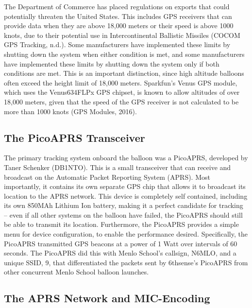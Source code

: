 \documentclass[12pt,]{article}
\begin{document}
The Department of Commerce has placed regulations on exports that could
potentially threaten the United States. This includes GPS receivers that
can provide data when they are above 18,000 meters or their speed is
above 1000 knots, due to their potential use in Intercontinental
Ballistic Missiles (COCOM GPS Tracking, n.d.). Some manufacturers have
implemented these limits by shutting down the system when either
condition is met, and some manufacturers have implemented these limits
by shutting down the system only if both conditions are met. This is an
important distinction, since high altitude balloons often exceed the
height limit of 18,000 meters. Sparkfun's Venus GPS module, which uses
the Venus634FLPx GPS chipset, is known to allow altitudes of over 18,000
meters, given that the speed of the GPS receiver is not calculated to be
more than 1000 knots (GPS Modules, 2016).

\subsection{The PicoAPRS Transceiver}\label{the-picoaprs-transceiver}

The primary tracking system onboard the balloon was a PicoAPRS,
developed by Taner Schenker (DB1NTO). This is a small transceiver that
can receive and broadcast on the Automatic Packet Reporting System
(APRS). Most importantly, it contains its own separate GPS chip that
allows it to broadcast its location to the APRS network. This device is
completely self contained, including its own 850MAh Lithium Ion battery,
making it a perfect candidate for tracking -- even if all other systems
on the balloon have failed, the PicoAPRS should still be able to
transmit its location. Furthermore, the PicoAPRS provides a simple menu
for device configuration, to enable the performance desired.
Specifically, the PicoAPRS transmitted GPS beacons at a power of 1 Watt
over intervals of 60 seconds. The PicoAPRS did this with Menlo School's
callsign, N6MLO, and a unique SSID, 9, that differentiated the packets
sent by 6thsense's PicoAPRS from other concurrent Menlo School balloon
launches.

\subsection{The APRS Network and
MIC-Encoding}\label{the-aprs-network-and-mic-encoding}
\end{document}

